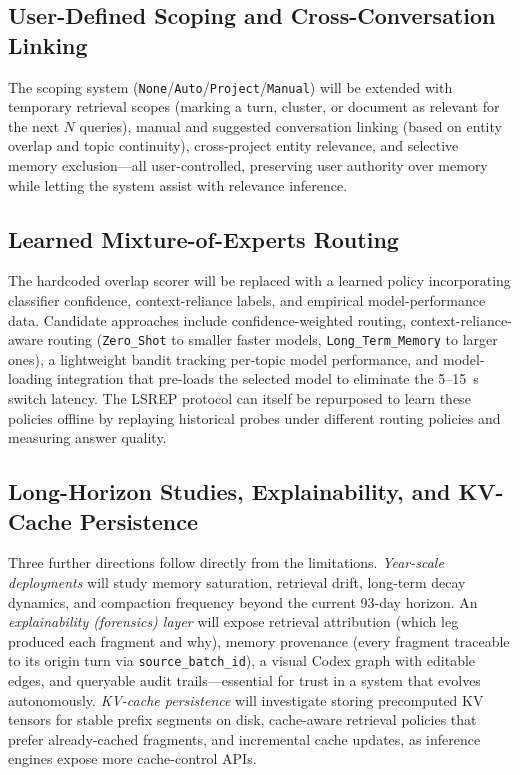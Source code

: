 \documentclass[10pt]{article}
\begin{document}
\subsection{User-Defined Scoping and Cross-Conversation Linking}
The scoping system (\texttt{None}/\texttt{Auto}/\texttt{Project}/\texttt{Manual}) will be extended with temporary retrieval scopes (marking a turn, cluster, or document as relevant for the next $N$ queries), manual and suggested conversation linking (based on entity overlap and topic continuity), cross-project entity relevance, and selective memory exclusion---all user-controlled, preserving user authority over memory while letting the system assist with relevance inference.

\subsection{Learned Mixture-of-Experts Routing}
The hardcoded overlap scorer will be replaced with a learned policy incorporating classifier confidence, context-reliance labels, and empirical model-performance data. Candidate approaches include confidence-weighted routing, context-reliance-aware routing (\texttt{Zero\_Shot} to smaller faster models, \texttt{Long\_Term\_Memory} to larger ones), a lightweight bandit tracking per-topic model performance, and model-loading integration that pre-loads the selected model to eliminate the 5--15~s switch latency. The LSREP protocol can itself be repurposed to learn these policies offline by replaying historical probes under different routing policies and measuring answer quality.

\subsection{Long-Horizon Studies, Explainability, and KV-Cache Persistence}
Three further directions follow directly from the limitations. \emph{Year-scale deployments} will study memory saturation, retrieval drift, long-term decay dynamics, and compaction frequency beyond the current 93-day horizon. An \emph{explainability (forensics) layer} will expose retrieval attribution (which leg produced each fragment and why), memory provenance (every fragment traceable to its origin turn via \texttt{source\_batch\_id}), a visual Codex graph with editable edges, and queryable audit trails---essential for trust in a system that evolves autonomously. \emph{KV-cache persistence} will investigate storing precomputed KV tensors for stable prefix segments on disk, cache-aware retrieval policies that prefer already-cached fragments, and incremental cache updates, as inference engines expose more cache-control APIs.
\end{document}
